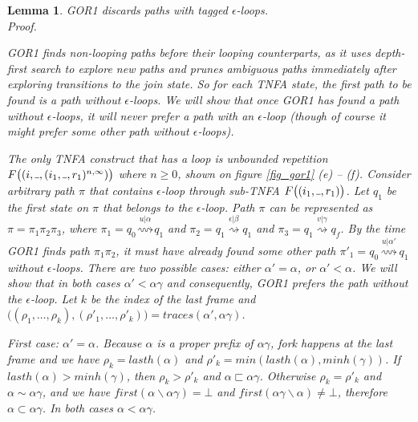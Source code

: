 \documentclass[AMA,STIX1COL]{WileyNJD-v2}
\newcommand{\Xund}{\rule{.4em}{.4pt}}
\newtheorem{XLem}{Lemma}
\begin{document}
\iffalse
    \begin{XLem}\label{gor1_loops}
    GOR1 discards paths with tagged $\epsilon$-loops.
    \\
    Proof.

    GOR1 finds non-looping paths before their looping counterparts,
    as it uses depth-first search to explore new paths and prunes ambiguous paths
    immediately after exploring transitions to the join state.
    So for each TNFA state, the first path to be found is a path without $\epsilon$-loops.
    We will show that once GOR1 has found a path without $\epsilon$-loops,
    it will never prefer a path with an $\epsilon$-loop
    (though of course it might prefer some other path without $\epsilon$-loops).

    The only TNFA construct that has a loop is unbounded repetition
    $F\big( (i, \Xund, (i_1, \Xund, r_1)^{n,\infty}) \big)$ where $n \geq 0$,
    shown on figure \ref{fig_gor1} (e) -- (f).
    Consider arbitrary path $\pi$ that contains
    $\epsilon$-loop through sub-TNFA $F\big( (i_1, \Xund, r_1) \big)$.
    Let $q_1$ be the first state on $\pi$ that belongs to the $\epsilon$-loop.
    Path $\pi$ can be represented as $\pi = \pi_1 \pi_2 \pi_3$, where
    $\pi_1 = q_0 \overset {u | \alpha} {\rightsquigarrow} q_1$ and
    $\pi_2 = q_1 \overset {\epsilon | \beta} {\rightsquigarrow} q_1$ and
    $\pi_3 = q_1 \overset {v | \gamma} {\rightsquigarrow} q_f$.
    By the time GOR1 finds path $\pi_1 \pi_2$,
    it must have already found some other path $\pi'_1 = q_0 \overset {u | \alpha'} {\rightsquigarrow} q_1$ without $\epsilon$-loops.
    There are two possible cases: either $\alpha' = \alpha$, or $\alpha' < \alpha$.
    We will show that in both cases $\alpha' < \alpha \gamma$
    and consequently, GOR1 prefers the path without the $\epsilon$-loop.
    Let $k$ be the index of the last frame
    and $\big( (\rho_1, \hdots, \rho_k), (\rho'_1, \hdots, \rho'_k) \big) = traces (\alpha', \alpha \gamma)$.

    First case: $\alpha' = \alpha$.
    Because $\alpha$ is a proper prefix of $\alpha \gamma$,
    fork happens at the last frame and we have
    $\rho_k = lasth(\alpha)$ and
    $\rho'_k = min (lasth(\alpha), minh(\gamma))$.
    If $lasth(\alpha) > minh(\gamma)$, then $\rho_k > \rho'_k$ and $\alpha \sqsubset \alpha \gamma$.
    Otherwise $\rho_k = \rho'_k$ and $\alpha \sim \alpha \gamma$,
    and we have $first(\alpha \backslash \alpha \gamma) = \bot$ and $first(\alpha \gamma \backslash \alpha) \neq \bot$,
    therefore $\alpha \subset \alpha \gamma$.
    In both cases $\alpha < \alpha \gamma$.


\end{XLem}
\end{document}
